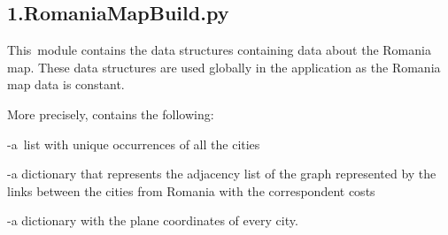 \documentclass[12pt]{article}
\begin{document}
\vspace{\baselineskip}
\subsection*{1.\hspace*{10pt}RomaniaMapBuild.py}
\begin{adjustwidth}{0.5in}{0.0in}
\begin{justify}
This\ module contains the data structures containing data about the Romania map.  These data structures are used globally in the application as the Romania map data is constant. 
\end{justify}\par

\end{adjustwidth}

\begin{adjustwidth}{0.5in}{0.0in}
\begin{justify}
More precisely, contains the following: 
\end{justify}\par

\end{adjustwidth}

\begin{adjustwidth}{0.5in}{0.0in}
\begin{justify}
-a\ list with unique occurrences of  all the cities
\end{justify}\par

\end{adjustwidth}

\begin{adjustwidth}{0.5in}{0.0in}
\begin{justify}
 -a dictionary that represents the adjacency list of the graph represented by the links between the cities from Romania with the correspondent costs
\end{justify}\par

\end{adjustwidth}

\begin{adjustwidth}{0.5in}{0.0in}
\begin{justify}
-a dictionary with the plane coordinates of every city.
\end{justify}\par

\end{adjustwidth}
\end{document}
